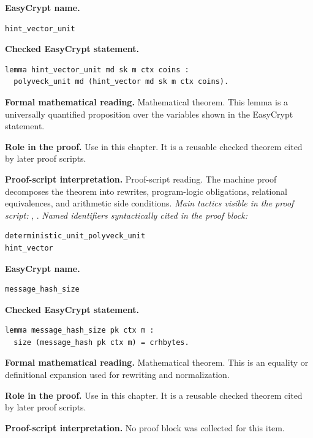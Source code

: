 \begin{formaltheorem}
\noindent\textbf{EasyCrypt name.}
\begin{lstlisting}[language=EasyCrypt,basicstyle=\ttfamily\scriptsize]
hint_vector_unit
\end{lstlisting}
\noindent\textbf{Checked EasyCrypt statement.}
\begin{lstlisting}[language=EasyCrypt,basicstyle=\ttfamily\scriptsize]
lemma hint_vector_unit md sk m ctx coins :
  polyveck_unit md (hint_vector md sk m ctx coins).
\end{lstlisting}
\noindent\textbf{Formal mathematical reading.}
Mathematical theorem. This lemma is a universally quantified proposition over the variables shown in the EasyCrypt statement.

\noindent\textbf{Role in the proof.}
Use in this chapter. It is a reusable checked theorem cited by later proof scripts.

\noindent\textbf{Proof-script interpretation.}
Proof-script reading. The machine proof decomposes the theorem into rewrites, program-logic obligations, relational equivalences, and arithmetic side conditions.
\emph{Main tactics visible in the proof script:} , .
\emph{Named identifiers syntactically cited in the proof block:}
\begin{lstlisting}[language=EasyCrypt,basicstyle=\ttfamily\scriptsize]
deterministic_unit_polyveck_unit
hint_vector
\end{lstlisting}

\end{formaltheorem}

\begin{formaltheorem}
\noindent\textbf{EasyCrypt name.}
\begin{lstlisting}[language=EasyCrypt,basicstyle=\ttfamily\scriptsize]
message_hash_size
\end{lstlisting}
\noindent\textbf{Checked EasyCrypt statement.}
\begin{lstlisting}[language=EasyCrypt,basicstyle=\ttfamily\scriptsize]
lemma message_hash_size pk ctx m :
  size (message_hash pk ctx m) = crhbytes.
\end{lstlisting}
\noindent\textbf{Formal mathematical reading.}
Mathematical theorem. This is an equality or definitional expansion used for rewriting and normalization.

\noindent\textbf{Role in the proof.}
Use in this chapter. It is a reusable checked theorem cited by later proof scripts.

\noindent\textbf{Proof-script interpretation.}
No proof block was collected for this item.

\end{formaltheorem}

